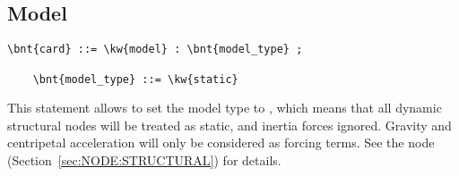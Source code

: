 \subsection{Model}
\label{sec:CONTROLDATA:MODEL}
\begin{Verbatim}[commandchars=\\\{\}]
    \bnt{card} ::= \kw{model} : \bnt{model_type} ;

    \bnt{model_type} ::= \kw{static}
\end{Verbatim}
This statement allows to set the model type to , which means
that all dynamic structural nodes will be treated as static, and inertia
forces ignored.
Gravity and centripetal acceleration will only be considered as forcing
terms.
See the  node (Section~\ref{sec:NODE:STRUCTURAL}) for details.




